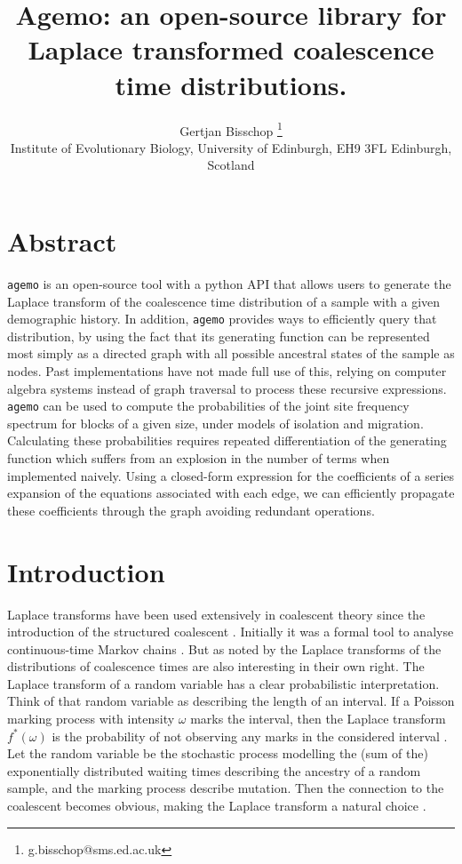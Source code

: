 \documentclass[10pt, a4]{article}
\title{Agemo: an open-source library for Laplace transformed coalescence time distributions.}
\author{Gertjan Bisschop \thanks{g.bisschop@sms.ed.ac.uk} \\ Institute of Evolutionary Biology, University of Edinburgh, EH9 3FL Edinburgh, Scotland}
\date{}
\begin{document}
\maketitle

\section*{Abstract}
\texttt{agemo} is an open-source tool with a python API that allows users to generate the Laplace transform of the coalescence time distribution of a sample with a given demographic history. In addition, \texttt{agemo} provides ways to efficiently query that distribution, by using the fact that its generating function can be represented most simply as a directed graph with all possible ancestral states of the sample as nodes. Past implementations have not made full use of this, relying on computer algebra systems instead of graph traversal to process these recursive expressions.
\texttt{agemo} can be used to compute the probabilities of the joint site frequency spectrum for blocks of a given size, under models of isolation and migration. Calculating these probabilities requires repeated differentiation of the generating function which suffers from an explosion in the number of terms when implemented naively. Using a closed-form expression for the coefficients of a series expansion of the equations associated with each edge, we can efficiently propagate these coefficients through the graph avoiding redundant operations.

\vspace{0.25cm} 
\linenumbers

\section{Introduction}

Laplace transforms have been used extensively in coalescent theory since the introduction of the structured coalescent \citep{Takahata1988, Notohara1990, Barton1995}. Initially it was a formal tool to analyse continuous-time Markov chains \citep{Takahata1988, Griffiths1991, Wilkinson-herbots1998}. But as noted by \citet{Wilkinson-herbots1998} the Laplace transforms of the distributions of coalescence times are also interesting in their own right. The Laplace transform of a random variable has a clear probabilistic interpretation. Think of that random variable as describing the length of an interval. If a Poisson marking process with intensity $\omega$ marks the interval, then the Laplace transform $f^*(\omega)$ is the probability of not observing any marks in the considered interval \citep{Rade1972}. Let the random variable be the stochastic process modelling the (sum of the) exponentially distributed waiting times describing the ancestry of a random sample, and the marking process describe mutation. Then the connection to the coalescent \citep{Kingman1982, Hudson1983, Tajima1983} becomes obvious, making the Laplace transform a natural choice \citep{Weissman2017}.
\end{document}
